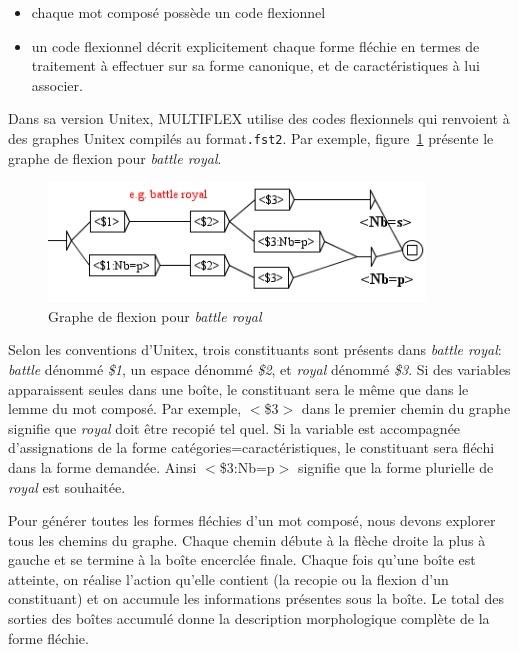 \begin{itemize}
\item chaque mot composé possède un code flexionnel
\item un code flexionnel décrit explicitement chaque forme fléchie en termes de traitement à
	effectuer sur sa forme canonique, et de caractéristiques à lui associer.
\end{itemize}

\bigskip
\noindent Dans sa version Unitex, MULTIFLEX utilise des codes flexionnels qui renvoient à des graphes
Unitex compilés au format\verb+.fst2+. Par exemple, figure~\ref{fig:BattleRoyal} présente le graphe de flexion pour \emph{battle royal}.

\begin{figure}[!htb]
  \centering
  \includegraphics[width=10cm]{resources/img/BattleRoyal.png}
  \caption{Graphe de flexion pour \emph{battle royal}}
  \label{fig:BattleRoyal}
\end{figure}

\bigskip
\noindent Selon les conventions d'Unitex, trois constituants sont présents dans \emph{battle royal}:
\emph{battle} dénommé \emph{\$1}, un espace dénommé \emph{\$2}, et \emph{royal} dénommé \emph{\$3}.
Si des variables apparaissent seules dans une boîte, le constituant sera le même que dans le  lemme
du mot composé. Par exemple, $<$\$3$>$ dans le premier chemin du graphe signifie que \emph{royal}
doit être recopié tel quel. Si la variable est accompagnée d'assignations de la forme
catégories=caractéristiques, le constituant sera fléchi dans la forme demandée. Ainsi $<$\$3:Nb=p$>$
signifie que la  forme plurielle de \emph{royal} est souhaitée.

\bigskip
\noindent Pour générer toutes les formes fléchies d'un mot composé, nous devons explorer tous les
chemins du graphe. Chaque chemin débute à la flèche droite la plus à gauche et se termine à la 
boîte encerclée finale. Chaque fois qu'une boîte est atteinte, on réalise l'action qu'elle contient
(la recopie ou la flexion d'un constituant) et on accumule les informations présentes sous la boîte.
Le total des sorties des boîtes accumulé donne la description morphologique complète de la forme
fléchie.

